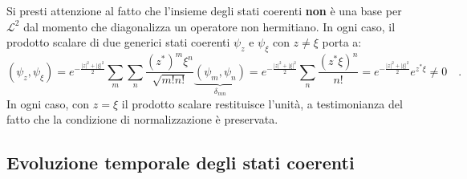 Si presti attenzione al fatto che l'insieme degli stati coerenti \textbf{non} è una base per $\mathcal{L}^2$ dal momento che diagonalizza un operatore non hermitiano. In ogni caso, il prodotto scalare di due generici stati coerenti $\psi_z$ e $\psi_\xi$ con $z \neq \xi$ porta a:
\[
    (\psi_z, \psi_\xi) = e^{-\frac{|z|^2+|\xi|^2}{2}}\sum_m \sum_n \frac{(z^*)^m \xi^n}{\sqrt{m!n!}}\underbrace{(\psi_m, \psi_n)}_{\delta_{mn}} =  e^{-\frac{|z|^2+|\xi|^2}{2}} \sum_n \frac{(z^*\xi)^n}{n!} = e^{-\frac{|z|^2+|\xi|^2}{2}} e^{z^* \xi} \neq 0 \quad.
\]
In ogni caso, con $z = \xi$ il prodotto scalare restituisce l'unità, a testimonianza del fatto che la condizione di normalizzazione è preservata. 

\subsection{Evoluzione temporale degli stati coerenti}

